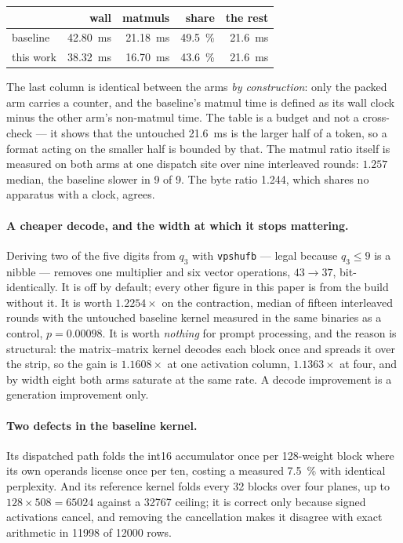 \documentclass[11pt,a4paper]{article}
\newcommand{\code}[1]{\texttt{#1}}
\begin{document}
\begin{center}
\begin{tabular}{lrrrr}
\toprule
 & wall & matmuls & share & the rest \\
\midrule
baseline & \SI{42.80}{\milli\second} & \SI{21.18}{\milli\second} & \SI{49.5}{\percent} & \SI{21.6}{\milli\second} \\
this work & \SI{38.32}{\milli\second} & \SI{16.70}{\milli\second} & \SI{43.6}{\percent} & \SI{21.6}{\milli\second} \\
\bottomrule
\end{tabular}
\end{center}

The last column is identical between the arms \emph{by construction}: only the
packed arm carries a counter, and the baseline's matmul time is defined as its
wall clock minus the other arm's non-matmul time. The table is a budget and not
a cross-check --- it shows that the untouched \SI{21.6}{\milli\second} is the
larger half of a token, so a format acting on the smaller half is bounded by
that. The matmul ratio itself is measured on both arms at one dispatch site over
nine interleaved rounds: $\num{1.257}$ median, the baseline slower in 9 of 9.
The byte ratio \num{1.244}, which shares no apparatus with a clock, agrees.

\paragraph{A cheaper decode, and the width at which it stops mattering.}
Deriving two of the five digits from $q_{3}$ with \code{vpshufb} --- legal
because $q_{3}\le9$ is a nibble --- removes one multiplier and six vector
operations, $43\to37$, bit-identically. It is off by default; every other figure in this paper is from the build
without it. It is worth $\num{1.2254}\times$ on the contraction, median of fifteen interleaved rounds with the untouched baseline
kernel measured in the same binaries as a control, $p=\num{0.00098}$. It is
worth \emph{nothing} for prompt processing, and the reason is structural: the
matrix--matrix kernel decodes each block once and spreads it over the strip, so
the gain is $\num{1.1608}\times$ at one activation column, $\num{1.1363}\times$
at four, and by width eight both arms saturate at the same rate. A decode
improvement is a generation improvement only.

\paragraph{Two defects in the baseline kernel.} Its dispatched path folds the
int16 accumulator once per 128-weight block where its own operands license once
per ten, costing a measured \SI{7.5}{\percent} with identical perplexity. And
its reference kernel folds every 32 blocks over four planes, up to
$128\times508=\num{65024}$ against a \num{32767} ceiling; it is correct only
because signed activations cancel, and removing the cancellation makes it
disagree with exact arithmetic in \num{11998} of \num{12000} rows.
\end{document}
